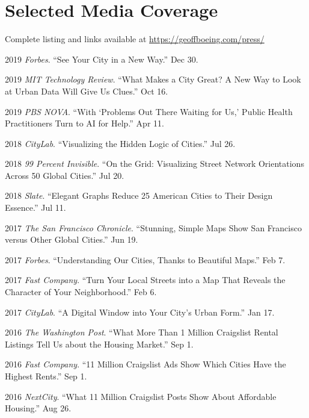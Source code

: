\documentclass[12pt,letterpaper]{report}
\begin{document}
    \section*{Selected Media Coverage}

    Complete listing and links available at \href{https://geoffboeing.com/press/}{https://geoffboeing.com/press/} \bigskip

    \begin{tablist}
    	
    	\item[2019] \tab \textit{Forbes}. \enquote{See Your City in a New Way.} Dec 30.
    	
    	\item[2019] \tab \textit{MIT Technology Review}. \enquote{What Makes a City Great? A New Way to Look at Urban Data Will Give Us Clues.} Oct 16.

        \item[2019] \tab \textit{PBS NOVA}. \enquote{With \enquote{Problems Out There Waiting for Us,} Public Health Practitioners Turn to AI for Help.} Apr 11.
        
        \item[2018] \tab \textit{CityLab}. \enquote{Visualizing the Hidden Logic of Cities.} Jul 26.

        \item[2018] \tab \textit{99 Percent Invisible}. \enquote{On the Grid: Visualizing Street Network Orientations Across 50 Global Cities.} Jul 20.

        \item[2018] \tab \textit{Slate}. \enquote{Elegant Graphs Reduce 25 American Cities to Their Design Essence.} Jul 11.

        \item[2017] \tab \textit{The San Francisco Chronicle}. \enquote{Stunning, Simple Maps Show San Francisco versus Other Global Cities.} Jun 19.

        \item[2017] \tab \textit{Forbes}. \enquote{Understanding Our Cities, Thanks to Beautiful Maps.} Feb 7.

        \item[2017] \tab \textit{Fast Company}. \enquote{Turn Your Local Streets into a Map That Reveals the Character of Your Neighborhood.} Feb 6.

        \item[2017] \tab \textit{CityLab}. \enquote{A Digital Window into Your City's Urban Form.} Jan 17.

        \item[2016] \tab \textit{The Washington Post}. \enquote{What More Than 1 Million Craigslist Rental Listings Tell Us about the Housing Market.} Sep 1.

        \item[2016] \tab \textit{Fast Company}. \enquote{11 Million Craigslist Ads Show Which Cities Have the Highest Rents.} Sep 1.

        \item[2016] \tab \textit{NextCity}. \enquote{What 11 Million Craigslist Posts Show About Affordable Housing.} Aug 26.

    \end{tablist}
\end{document}
